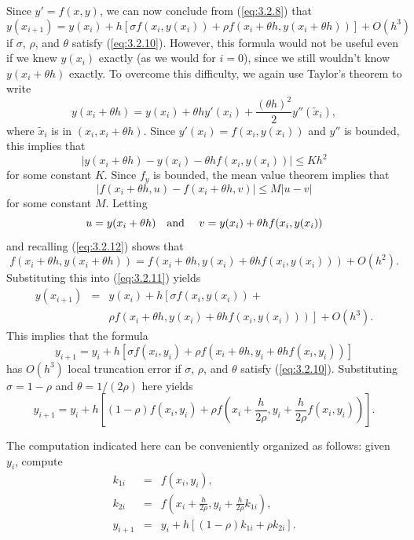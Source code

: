 Since $y'=f(x,y)$, we can now conclude from (\ref{eq:3.2.8}) that
\begin{equation}
  \label{eq:3.2.11}y(x_{i+1})=y(x_{i})+h\left[\sigma f(x_{i},y(x_{i}))+\rho f(x_{i}+\theta h,y(x_{i}+\theta h))\right]+O(h^{3})
\end{equation}
if $\sigma$, $\rho$, and $\theta$ satisfy (\ref{eq:3.2.10}). However, this formula would not be
useful even if we knew $y(x_{i})$ exactly (as we would for $i=0$), since we still wouldn't know
$y(x_{i}+\theta h)$ exactly. To overcome this difficulty, we again use Taylor's theorem to write
\[
  y(x_{i}+\theta h)=y(x_{i})+\theta hy'(x_{i})+\frac{(\theta h)^{2}}{2}y''(\tilde{x}_{i}),
\]
where $\tilde{x}_{i}$ is in $(x_{i},x_{i}+\theta h)$. Since $y'(x_{i})=f(x_{i},y(x_{i}))$ and $y''$
is bounded, this implies that
\begin{equation}
  \label{eq:3.2.12}|y(x_{i}+\theta h)-y(x_{i})-\theta hf(x_{i},y(x_{i}))|\le Kh^{2}
\end{equation}
for some constant $K$. Since $f_{y}$ is bounded, the mean value theorem implies that
\[
  |f(x_{i}+\theta h,u)-f(x_{i}+\theta h,v)|\le M|u-v|
\]
for some constant $M$. Letting
\[
  u=y(x_{i}+\theta h)\mbox{\quad and \quad}v=y(x_{i})+\theta hf(x_{i},y(x_{i}))
\]
and recalling (\ref{eq:3.2.12}) shows that
\[
  f(x_{i}+\theta h,y(x_{i}+\theta h))=f(x_{i}+\theta h,y(x_{i})+\theta h f(x_{i},y(x_{i})))+O(h^{2}).
\]
Substituting this into (\ref{eq:3.2.11}) yields
\begin{eqnarray*}
  y(x_{i+1}) & = & y(x_{i})+h\left[\sigma f(x_{i},y(x_{i}))+\right. \\
             &   & \left.\rho f(x_{i}+\theta h,y(x_{i})+\theta hf(x_{i},y(x_{i})))\right]+O(h^{3}).
\end{eqnarray*}
This implies that the formula
\[
  y_{i+1}=y_{i}+h\left[\sigma f(x_{i},y_{i})+\rho f(x_{i}+\theta h,y_{i}+\theta hf(x_{i},y_{i}))\right]
\]
has $O(h^{3})$ local truncation error if $\sigma$, $\rho$, and $\theta$ satisfy (\ref{eq:3.2.10}).
Substituting $\sigma=1-\rho$ and $\theta=1/(2\rho)$ here yields
\begin{equation}
  \label{eq:3.2.13}y_{i+1}=y_{i}+h\left[(1-\rho)f(x_{i},y_{i})+\rho f\left(x_{i}+\frac{h}{2\rho}, y_{i}+\frac{h}{2\rho}f(x_{i},y_{i})\right)\right].
\end{equation}

The computation indicated here can be conveniently organized as follows: given $y_{i}$, compute
\begin{eqnarray*}
  k_{1i}  & = & f(x_{i},y_{i}),                                                  \\
  k_{2i}  & = & f\left(x_{i}+\frac{h}{2\rho},y_{i}+\frac{h}{2\rho}k_{1i}\right), \\
  y_{i+1} & = & y_{i}+h[(1-\rho)k_{1i}+\rho k_{2i}].
\end{eqnarray*}

